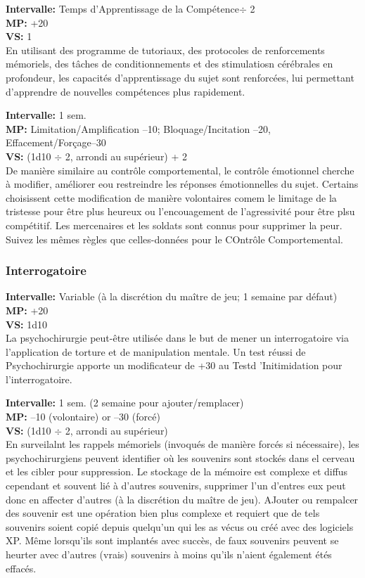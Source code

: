  \textbf{Intervalle:} Temps d'Apprentissage de la Compétence$\div$ 2 \\ \textbf{MP:} +20 \\ \textbf{VS:} 1 \\ En utilisant des programme de tutoriaux, des protocoles de renforcements mémoriels, des tâches de conditionnements et des stimulatiosn cérébrales en profondeur, les capacités d'apprentissage du sujet sont renforcées, lui permettant d'apprendre de nouvelles compétences plus rapidement. 

 \textbf{Intervalle:} 1 sem. \\ \textbf{MP:} Limitation/Amplification –10; Bloquage/Incitation –20, Effacement/Forçage–30 \\ \textbf{VS:} (1d10 $\div$ 2, arrondi au supérieur) + 2\\ De manière similaire au contrôle comportemental, le contrôle émotionnel cherche à modifier, améliorer eou restreindre les réponses émotionnelles du sujet. Certains choisissent cette modification de manière volontaires comem le limitage de la tristesse pour être plus heureux ou l'encouagement de l'agressivité pour être plsu compétitif. Les mercenaires et les soldats sont connus pour supprimer la peur. Suivez les mêmes règles que celles-données pour le COntrôle Comportemental. 



\subsubsection{Interrogatoire} \textbf{Intervalle:} Variable (à la discrétion du maître de jeu; 1 semaine par défaut) \\ \textbf{MP:} +20 \\ \textbf{VS:} 1d10 \\ La psychochirurgie peut-être utilisée dans le but de mener un interrogatoire via l'application de torture et de manipulation mentale. Un test réussi de Psychochirurgie apporte un modificateur de +30 au Testd 'Initimidation pour l'interrogatoire. 

 \textbf{Intervalle:} 1 sem. (2 semaine pour ajouter/remplacer) \\ \textbf{MP:} –10 (volontaire) or –30 (forcé) \\ \textbf{VS:} (1d10 $\div$ 2, arrondi au supérieur) \\ En surveilalnt les rappels mémoriels (invoqués de manière forcés si nécessaire), les psychochirurgiens peuvent identifier où les souvenirs sont stockés dans el cerveau et les cibler pour suppression. Le stockage de la mémoire est complexe et diffus cependant et souvent lié à d'autres souvenirs, supprimer l'un d'entres eux peut donc en affecter d'autres (à la discrétion du maître de jeu). AJouter ou rempalcer des souvenir est une opération bien plus complexe et requiert que de tels souvenirs soient copié depuis quelqu'un qui les as vécus ou créé avec des logiciels XP. Même lorsqu'ils sont implantés avec succès, de faux souvenirs peuvent se heurter avec d'autres (vrais) souvenirs à moins qu'ils n'aient également étés effacés. 

